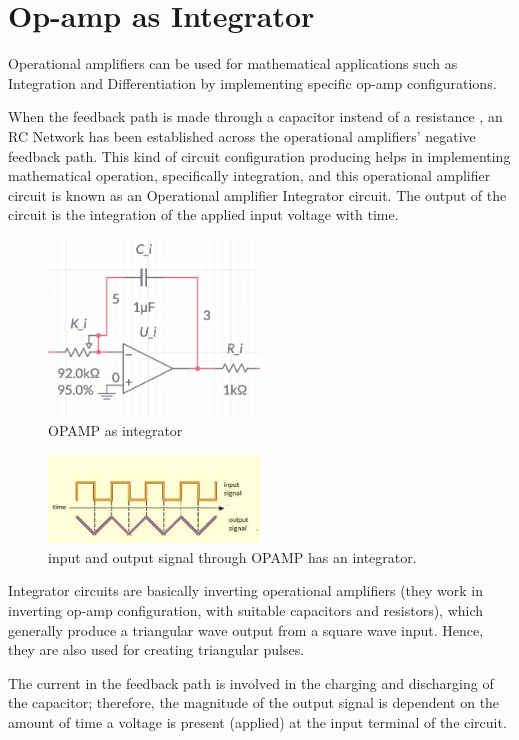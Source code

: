  \section{Op-amp as Integrator}
 Operational amplifiers can be used for mathematical applications such as Integration and Differentiation by implementing specific op-amp configurations.

When the feedback path is made through a capacitor instead of a resistance , an RC Network has been established across the operational amplifiers’ negative feedback path. This kind of circuit configuration producing helps in implementing mathematical operation, specifically integration, and this operational amplifier circuit is known as an Operational amplifier Integrator circuit. The output of the circuit is the integration of the applied input voltage with time.
\begin{figure}[H]
	\includegraphics[width = 0.5\textwidth]{Opemp as I.png}
	\caption{OPAMP as integrator}
\end{figure}

\begin{figure}[H]
	\includegraphics[width = 0.5\textwidth]{Inpput and output singal.png}
	\caption{input and output signal through OPAMP has an integrator.}
\end{figure}
Integrator circuits are basically inverting operational amplifiers (they work in inverting op-amp configuration, with suitable capacitors and resistors), which generally produce a triangular wave output from a square wave input. Hence, they are also used for creating triangular pulses.

The current in the feedback path is involved in the charging and discharging of the capacitor; therefore, the magnitude of the output signal is dependent on the amount of time a voltage is present (applied) at the input terminal of the circuit.

